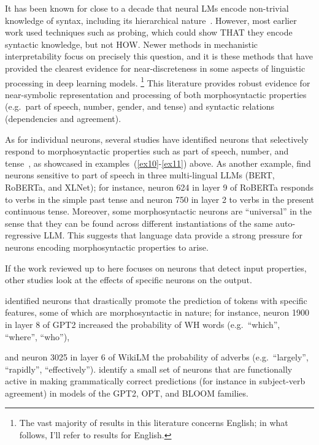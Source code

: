 It has been known for close to a decade that neural LMs encode non-trivial knowledge of syntax, including its hierarchical nature~\cite{linzen-etal-2016-assessing,gulordava-etal-2018-colorless,futrell-etal-2019-neural,rogers2021primer}. However, most earlier work used techniques such as probing, which could show THAT they encode syntactic knowledge, but not HOW.
Newer methods in mechanistic interpretability \cite[see][for a survey]{ferrando2024primerinnerworkingstransformerbased} focus on precisely this question, and it is these methods that have provided the clearest evidence for near-discreteness in some aspects of linguistic processing in deep learning models.
\footnote{The vast majority of results in this literature concerns English; in what follows, I'll refer to results for English.}
This literature provides robust evidence for near-symbolic representation and processing of both morphosyntactic properties (e.g.\ part of speech, number, gender, and tense) and syntactic relations (dependencies and agreement).

As for individual neurons, several studies have identified neurons that selectively respond to morphosyntactic properties such as part of speech, number, and tense~\cite{bau2019identifying,durrani+2023,gurnee2023findingneuronshaystackcase,gurnee2024universal}, as showcased in examples~(\ref{ex10}-\ref{ex11}) above. As another example, \citet{durrani+2023} find neurons sensitive to part of speech in three multi-lingual LLMs (BERT, RoBERTa, and XLNet); for instance, neuron 624 in layer 9 of RoBERTa responds to verbs in the simple past tense and neuron 750 in layer 2 to verbs in the present continuous tense.
Moreover, some morphosyntactic neurons are ``universal'' \cite{gurnee2024universal} in the sense that they can be found across different instantiations of the same auto-regressive LLM.
This suggests that language data provide a strong pressure for neurons encoding morphosyntactic properties to arise.

If the work reviewed up to here focuses on neurons that detect input properties, other studies look at the effects of specific neurons on the output.

\citet{geva-etal-2022-transformer} identified neurons that drastically promote the prediction of tokens with specific features, some of which are morphosyntactic in nature; for instance, neuron 1900 in layer 8 of GPT2 increased the probability of WH words (e.g.\ ``which'', ``where'', ``who''),

and neuron 3025 in layer 6 of WikiLM the probability of adverbs (e.g.\ ``largely'', ``rapidly'', ``effectively'').
\citet{ferrando-etal-2023-explaining} identify a small set of neurons that are functionally active in making grammatically correct predictions (for instance in subject-verb agreement) in models of the GPT2, OPT, and BLOOM families.

